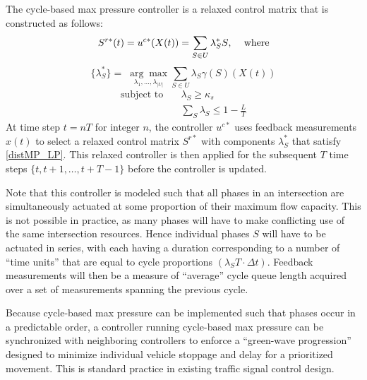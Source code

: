 
The cycle-based max pressure controller is a relaxed control matrix that is constructed as follows:
\begin{equation} \label{uc*} 
S^{r*}(t) = u^{c*} (X(t)) = \sum_{S \in U}\lambda_{S}^{*}S \text{, \quad where}
\end{equation}  
\begin{equation}  \label{distMP_LP}
\{ \lambda^*_S \} = \;  \underset{\lambda_{1},...,\lambda_{\vert U\vert}}{ \arg \max} \sum_{S \in U}\lambda_{S}\gamma(S)(X(t))
\end{equation}
\begin{align*}
\text{subject to} &\quad  \lambda_{S} \geq \kappa_s\\
&\quad \sum_{S} \lambda_{S} \leq 1 - \tfrac{L}{T} 
\end{align*}
At time step $t=nT$ for integer $n$, the controller $u^{c*}$ uses feedback measurements $x(t)$ to select a relaxed control matrix $S^{r*}$ with components $\lambda_S^*$ that satisfy \eqref{distMP_LP}. This relaxed controller is then applied for the subsequent $T$ time steps $\{t, t+1, \ldots, t+T-1\}$ before the controller is updated. 

Note that this controller is modeled such that all phases in an intersection are simultaneously actuated at some proportion of their maximum flow capacity. This is not possible in practice, as many phases will have to make conflicting use of the same intersection resources. Hence individual phases $S$ will have to be actuated in series, with each having a duration corresponding to a number of ``time units'' that are equal to cycle proportions $(\lambda_S T\cdot  \Delta t)$. Feedback measurements will then be a measure of ``average'' cycle queue length acquired over a set of measurements spanning the previous cycle.  

Because cycle-based max pressure can be implemented such that phases occur in a predictable order, a controller running cycle-based max pressure can be synchronized with neighboring controllers to enforce a ``green-wave progression'' designed to minimize individual vehicle stoppage and delay for a prioritized movement. This is standard practice in existing traffic signal control design. 

